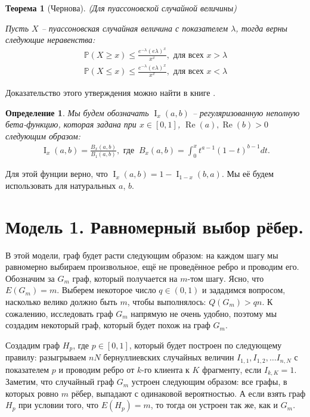 \documentclass{matmex-diploma-custom}
\newcommand{\PRob}{\mathbb P}
\newcommand{\leqs}{\leqslant}
\newcommand{\geqs}{\geqslant}
\DeclareMathOperator{\re}{Re}
\DeclareMathOperator{\I}{I}
\newtheorem{define}{Определение}
\theoremstyle{named}
\newtheorem*{namedtheorem}{Теорема}
\begin{document}
\begin{namedtheorem}[Чернова] (Для пуассоновской случайной величины)

Пусть $X$ -- пуассоновская случайная величина с показателем $\lambda$, тогда верны следующие неравенства:
\begin{align} \label{gr_1}
\PRob(X \geqs x) \leqs \frac{e^{-\lambda}(e\lambda)^x}{x^x}, \text{ для всех } x > \lambda 
\\
\label{gr_2}
\PRob(X \leqs x) \leqs \frac{e^{-\lambda}(e\lambda)^x}{x^x}, \text{ для всех } x < \lambda 
\end{align}
\end{namedtheorem}
Доказательство этого утверждения можно найти в книге \cite{chernov_gr}.

\medskip

\begin{define}
Мы будем обозначать $\I_x(a,b)$ -- регуляризованную неполную бета-функцию, 
которая задана при $x \in [0,1]$, $\re(a), \re(b) > 0$ следующим образом:
\begin{equation} \label{i_x} \begin{aligned}
\I_x(a,b) = \frac{B_x(a,b)}{B_1(a,b)}, \text{ где }~ 
B_x(a,b) = \int_0^x t^{a-1} (1-t)^{b-1} dt.
\end{aligned}\end{equation}
\end{define}
Для этой фунции верно, что $\I_x(a,b) = 1 - \I_{1-x}(b, a)$.
Мы её будем использовать для натуральных $a$, $b$.


\newpage
\section*{Модель 1. Равномерный выбор рёбер.}
В этой модели, граф будет расти следующим образом: на каждом шагу мы равномерно выбираем произвольное, ещё не проведённое ребро 
и проводим его. Обозначим за $G_m$ граф, который получается на $m$-том шагу. Ясно, что $E(G_m) = m$.
Выберем некоторое число $q \in (0, 1)$ и зададимся вопросом, насколько велико должно быть $m$, чтобы выполнялось: $Q(G_m) > qn$.
К сожалению, исследовать граф $G_m$ напрямую не очень удобно, поэтому мы создадим некоторый граф, который будет похож на граф $G_m$.

Создадим граф $H_p$, где $p \in [0, 1]$, который будет построен по следующему правилу: 
разыгрываем $nN$ бернуллиевских случайных величин $I_{1,1}, I_{1,2}, \dots I_{n,N}$ с показателем $p$ 
и проводим ребро от $k$-го клиента к $K$ фрагменту, если $I_{k, K} = 1$.
Заметим, что случайный граф $G_m$ устроен следующим образом: все графы, в которых ровно $m$ рёбер, выпадают с одинаковой вероятностью.
А если взять граф $H_p$ при условии того, что $E(H_p) = m$, то тогда он устроен так же, как и $G_m$.
\end{document}
